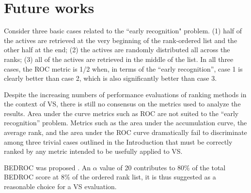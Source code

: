 \section{Future works}

Consider three basic cases related to the ``early recognition" problem. (1) half of the actives are retrieved at the very beginning of the rank-ordered list and the other half at the end; (2) the actives are randomly distributed all across the ranks; (3) all of the actives are retrieved in the middle of the list. In all three cases, the ROC metric is 1/2 when, in terms of the “early recognition”, case 1 is clearly better than case 2, which is also significantly better than case 3.

Despite the increasing numbers of performance evaluations of ranking methods in the context of VS, there is still no consensus on the metrics used to analyze the results. Area under the curve metrics such as ROC are not suited to the “early recognition” problem. Metrics such as the area under the accumulation curve, the average rank, and the area under the ROC curve dramatically fail to discriminate among three trivial cases outlined in the Introduction that must be correctly ranked by any metric intended to be usefully applied to VS.

BEDROC was proposed \citep{490}. An $\alpha$ value of 20 contributes to 80\% of the total BEDROC score at 8\% of the ordered rank list, it is thus suggested as a reasonable choice for a VS evaluation.

\chapterend
